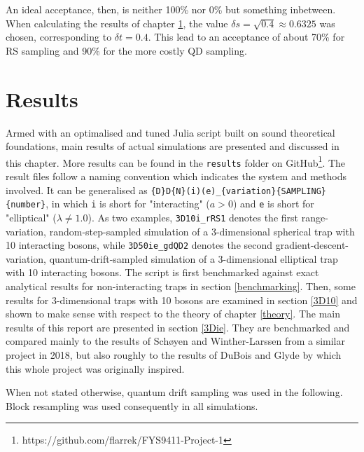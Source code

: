 \documentclass[a4paper,8pt]{article}
\begin{document}
\begin{multicols}{2}
An ideal acceptance, then, is neither 100\% nor 0\% but something inbetween. When calculating the results of chapter \ref{results}, the value ${\delta s = \sqrt{0.4} \approx 0.6325}$ was chosen, corresponding to ${\delta t = 0.4}$. This lead to an acceptance of about 70\% for RS sampling and 90\% for the more costly QD sampling.



\section{Results}\label{results}
Armed with an optimalised and tuned Julia script built on sound theoretical foundations, main results of actual simulations are presented and discussed in this chapter. More results can be found in the \texttt{results} folder on GitHub\footnote{https://github.com/flarrek/FYS9411-Project-1}. The result files follow a naming convention which indicates the system and methods involved. It can be generalised as \texttt{\{D\}D\{N\}(i)(e)\_\{variation\}\{SAMPLING\}\{number\}}, in which \texttt{i} is short for "interacting" ($a > 0$) and \texttt{e} is short for "elliptical" ($\lambda \neq 1.0$). As two examples, \texttt{3D10i\_rRS1} denotes the first range-variation, random-step-sampled simulation of a 3-dimensional spherical trap with 10 interacting bosons, while \texttt{3D50ie\_gdQD2} denotes the second gradient-descent-variation, quantum-drift-sampled simulation of a 3-dimensional elliptical trap with 10 interacting bosons. The script is first benchmarked against exact analytical results for non-interacting traps in section \ref{benchmarking}. Then, some results for 3-dimensional traps with 10 bosons are examined in section \ref{3D10} and shown to make sense with respect to the theory of chapter \ref{theory}. The main results of this report are presented in section \ref{3Die}. They are benchmarked and compared mainly to the results of Schøyen and Winther-Larssen\cite{SWL} from a similar project in 2018, but also roughly to the results of DuBois and Glyde\cite{DBG} by which this whole project was originally inspired.

When not stated otherwise, quantum drift sampling was used in the following. Block resampling was used consequently in all simulations.


\end{multicols}
\end{document}
